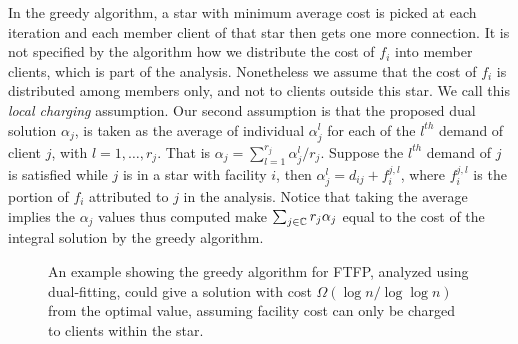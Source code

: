 \documentclass[oneside,final]{ucr}
\begin{document}
In the greedy algorithm, a star with minimum average cost is
picked at each iteration and each member client of that star
then gets one more connection. It is not specified by the
algorithm how we distribute the cost of $f_i$ into member
clients, which is part of the analysis. Nonetheless we
assume that the cost of $f_i$ is distributed among members
only, and not to clients outside this star. We call this
\emph{local charging} assumption. Our second assumption is
that the proposed dual solution $\alpha_j$, is taken as the
average of individual $\alpha_j^l$ for each of the $l^{th}$
demand of client $j$, with $l=1,\ldots,r_j$. That is
$\alpha_j = \sum_{l=1}^{r_j} \alpha_j^l / r_j$. Suppose the
$l^{th}$ demand of $j$ is satisfied while $j$ is in a star
with facility $i$, then $\alpha_j^l = d_{ij} + f_i^{j,l}$,
where $f_i^{j,l}$ is the portion of $f_i$ attributed to $j$
in the analysis. Notice that taking the average implies the
$\alpha_j$ values thus computed make $\sum_{j\in\mathbb{C}}
r_j \alpha_j$ equal to the cost of the integral solution by
the greedy algorithm.

\begin{figure}
  \centering
  \caption{An example showing the greedy algorithm for FTFP,
    analyzed using dual-fitting, could give a solution with
    cost $\Omega(\log n / \log\log n)$ from the optimal
    value, assuming facility cost can only be charged to
    clients within the star.}
  \label{fig:greedy_lower_bound}
\end{figure}
\end{document}
